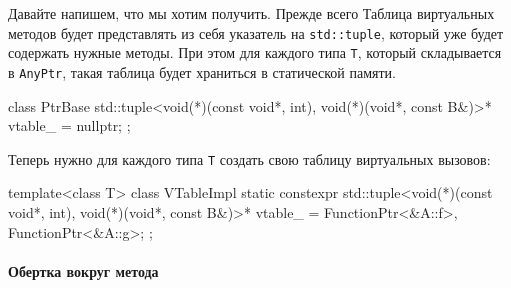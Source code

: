 Давайте напишем, что мы хотим получить.
Прежде всего Таблица виртуальных методов будет представлять из себя указатель на \verb"std::tuple", который уже будет содержать нужные методы.
При этом для каждого типа \verb"T", который складывается в \verb"AnyPtr", такая таблица будет храниться в статической памяти.
\begin{cppcode}
class PtrBase {
  std::tuple<void(*)(const void*, int), void(*)(void*, const B&)>* vtable_ = nullptr;
};
\end{cppcode}
Теперь нужно для каждого типа \verb"T" создать свою таблицу виртуальных вызовов:
\begin{cppcode}
template<class T>
class VTableImpl {
  static constexpr std::tuple<void(*)(const void*, int), void(*)(void*, const B&)>* vtable_ =
    {FunctionPtr<&A::f>, FunctionPtr<&A::g>};
};
\end{cppcode}

\paragraph{Обертка вокруг метода}

